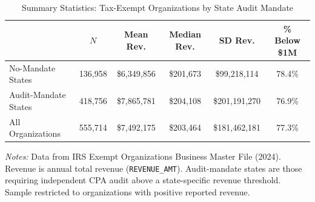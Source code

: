 \begin{table}[t]
\centering
\caption{Summary Statistics: Tax-Exempt Organizations by State Audit Mandate}
\label{tab:summary}
\small
\begin{tabular}{lccccc}
\hline\hline
 & $N$ & Mean Rev. & Median Rev. & SD Rev. & \% Below \$1M \\
\hline
No-Mandate States & 136,958 & \$6,349,856 & \$201,673 & \$99,218,114 & 78.4\% \\
Audit-Mandate States & 418,756 & \$7,865,781 & \$204,108 & \$201,191,270 & 76.9\% \\
All Organizations & 555,714 & \$7,492,175 & \$203,464 & \$181,462,181 & 77.3\% \\
\hline\hline
\end{tabular}
\begin{tablenotes}[flushleft]
\small
\item \textit{Notes:} Data from IRS Exempt Organizations Business Master File (2024). Revenue is annual total revenue (\texttt{REVENUE\_AMT}). Audit-mandate states are those requiring independent CPA audit above a state-specific revenue threshold. Sample restricted to organizations with positive reported revenue.
\end{tablenotes}
\end{table}
